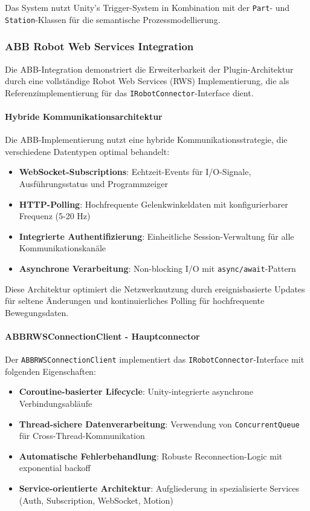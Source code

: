 Das System nutzt Unity's Trigger-System in Kombination mit der \texttt{Part}-
und \texttt{Station}-Klassen für die semantische Prozessmodellierung.

\subsubsection{ABB Robot Web Services Integration}

Die ABB-Integration demonstriert die Erweiterbarkeit der Plugin-Architektur
durch eine vollständige Robot Web Services (RWS) Implementierung, die als
Referenzimplementierung für das \texttt{IRobotConnector}-Interface dient.

\paragraph{Hybride Kommunikationsarchitektur}
Die ABB-Implementierung nutzt eine hybride Kommunikationsstrategie, die
verschiedene Datentypen optimal behandelt:

\begin{itemize}
    \item \textbf{WebSocket-Subscriptions}: Echtzeit-Events für I/O-Signale, Ausführungsstatus und Programmzeiger
    \item \textbf{HTTP-Polling}: Hochfrequente Gelenkwinkeldaten mit konfigurierbarer Frequenz (5-20 Hz)
    \item \textbf{Integrierte Authentifizierung}: Einheitliche Session-Verwaltung für alle Kommunikationskanäle
    \item \textbf{Asynchrone Verarbeitung}: Non-blocking I/O mit \texttt{async/await}-Pattern
\end{itemize}

Diese Architektur optimiert die Netzwerknutzung durch ereignisbasierte Updates
für seltene Änderungen und kontinuierliches Polling für hochfrequente
Bewegungsdaten.

\paragraph{ABBRWSConnectionClient - Hauptconnector}
Der \texttt{ABBRWSConnectionClient} implementiert das
\texttt{IRobotConnector}-Interface mit folgenden Eigenschaften:

\begin{itemize}
    \item \textbf{Coroutine-basierter Lifecycle}: Unity-integrierte asynchrone Verbindungsabläufe
    \item \textbf{Thread-sichere Datenverarbeitung}: Verwendung von \texttt{ConcurrentQueue} für Cross-Thread-Kommunikation
    \item \textbf{Automatische Fehlerbehandlung}: Robuste Reconnection-Logic mit exponential backoff
    \item \textbf{Service-orientierte Architektur}: Aufgliederung in spezialisierte Services (Auth, Subscription, WebSocket, Motion)
\end{itemize}

